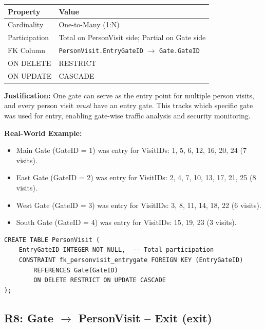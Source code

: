 \documentclass[a4paper, 12pt]{article}
\begin{document}
\begin{table}[H]
\centering
\small
\begin{tabularx}{\textwidth}{l X}
\toprule
\textbf{Property} & \textbf{Value} \\
\midrule
Cardinality & One-to-Many (1:N) \\
Participation & Total on PersonVisit side; Partial on Gate side \\
FK Column & \texttt{PersonVisit.EntryGateID} $\rightarrow$ \texttt{Gate.GateID} \\
ON DELETE & RESTRICT \\
ON UPDATE & CASCADE \\
\bottomrule
\end{tabularx}
\end{table}

\textbf{Justification:} One gate can serve as the entry point for multiple person visits, and every person visit \textit{must} have an entry gate. This tracks which specific gate was used for entry, enabling gate-wise traffic analysis and security monitoring.

\textbf{Real-World Example:}
\begin{itemize}[leftmargin=*, nosep]
    \item Main Gate (GateID = 1) was entry for VisitIDs: 1, 5, 6, 12, 16, 20, 24 (7 visits).
    \item East Gate (GateID = 2) was entry for VisitIDs: 2, 4, 7, 10, 13, 17, 21, 25 (8 visits).
    \item West Gate (GateID = 3) was entry for VisitIDs: 3, 8, 11, 14, 18, 22 (6 visits).
    \item South Gate (GateID = 4) was entry for VisitIDs: 15, 19, 23 (3 visits).
\end{itemize}

\begin{lstlisting}[style=sqlstyle, caption={R7 Implementation}, label={lst:r7}]
CREATE TABLE PersonVisit (
    EntryGateID INTEGER NOT NULL,  -- Total participation
    CONSTRAINT fk_personvisit_entrygate FOREIGN KEY (EntryGateID)
        REFERENCES Gate(GateID)
        ON DELETE RESTRICT ON UPDATE CASCADE
);
\end{lstlisting}

\subsection{R8: Gate \texorpdfstring{$\rightarrow$}{->} PersonVisit -- Exit (exit)}
\end{document}
